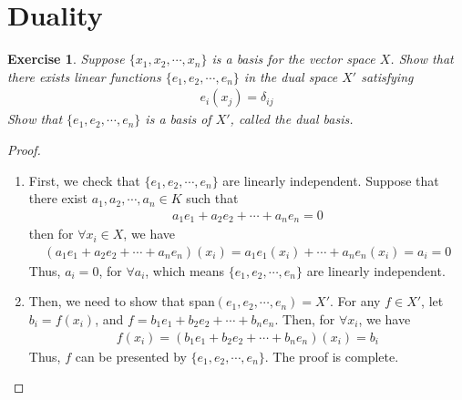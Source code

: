 \documentclass[11pt]{book}
\newtheorem{exercise}{Exercise}[section]
\theoremstyle{definition}
\numberwithin{equation}{subsection}
\begin{document}
\section{Duality}
\begin{exercise}
Suppose $\{x_1, x_2,\cdots, x_n\}$ is a basis for the vector space $X$. Show that there exists linear functions $\{e_1, e_2,\cdots, e_n\}$ in the dual space $X'$ satisfying 
\begin{align*}
    e_i(x_j) = \delta_{ij}
\end{align*}
Show that $\{e_1, e_2,\cdots, e_n\}$ is a basis of $X'$, called the dual basis.
\end{exercise}
\begin{proof}
~\begin{enumerate}[label=(\arabic*)]
    \item First, we check that $\{e_1, e_2, \cdots, e_n\}$ are linearly independent. Suppose that there exist  $a_1, a_2, \cdots, a_n \in K$ such that 
    \begin{align*}
        a_1 e_1 + a_2 e_2 + \cdots + a_n e_n = 0
    \end{align*}
    then for $\forall x_i \in X$, we have
    \begin{align*}
        (a_1 e_1 + a_2 e_2 + \cdots + a_n e_n)(x_i) = a_1 e_1(x_i) + \cdots + a_n e_n(x_i) = a_i = 0
    \end{align*}
    Thus, $a_i = 0$, for $\forall a_i$, which means $\{e_1, e_2, \cdots, e_n\}$ are linearly independent.
    \item Then, we need to show that span$(e_1, e_2, \cdots, e_n) = X'$. For any $f \in X'$, let $b_i  = f(x_i)$, and $f = b_1 e_1 + b_2 e_2 + \cdots + b_n e_n$. Then, for $\forall x_i$, we have
    \begin{align*}
        f(x_i) = (b_1 e_1 + b_2 e_2 + \cdots + b_n e_n)(x_i) = b_i
    \end{align*}
    Thus, $f$ can be presented by $\{e_1, e_2, \cdots, e_n\}$. The proof is complete.
\end{enumerate}
\end{proof}

\medskip
\end{document}
